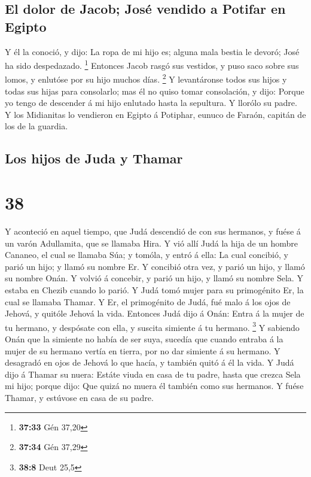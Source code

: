 \hypertarget{el-dolor-de-jacob-josuxe9-vendido-a-potifar-en-egipto}{%
\subsection{El dolor de Jacob; José vendido a Potifar en
Egipto}\label{el-dolor-de-jacob-josuxe9-vendido-a-potifar-en-egipto}}

 Y él la conoció, y dijo: La ropa de mi hijo es; alguna
mala bestia le devoró; José ha sido despedazado. \footnote{\textbf{37:33}
  Gén 37,20}  Entonces Jacob rasgó sus vestidos, y puso
saco sobre sus lomos, y enlutóse por su hijo muchos días. \footnote{\textbf{37:34}
  Gén 37,29}  Y levantáronse todos sus hijos y todas sus
hijas para consolarlo; mas él no quiso tomar consolación, y dijo: Porque
yo tengo de descender á mi hijo enlutado hasta la sepultura. Y llorólo
su padre.  Y los Midianitas lo vendieron en Egipto á
Potiphar, eunuco de Faraón, capitán de los de la guardia.

\hypertarget{los-hijos-de-juda-y-thamar}{%
\subsection{Los hijos de Juda y
Thamar}\label{los-hijos-de-juda-y-thamar}}

\hypertarget{section-37}{%
\section{38}\label{section-37}}

 Y aconteció en aquel tiempo, que Judá descendió de con sus
hermanos, y fuése á un varón Adullamita, que se llamaba Hira.
 Y vió allí Judá la hija de un hombre Cananeo, el cual se
llamaba Súa; y tomóla, y entró á ella:  La cual concibió, y
parió un hijo; y llamó su nombre Er.  Y concibió otra vez, y
parió un hijo, y llamó su nombre Onán.  Y volvió á concebir,
y parió un hijo, y llamó su nombre Sela. Y estaba en Chezib cuando lo
parió.  Y Judá tomó mujer para su primogénito Er, la cual se
llamaba Thamar.  Y Er, el primogénito de Judá, fué malo á
los ojos de Jehová, y quitóle Jehová la vida.  Entonces Judá
dijo á Onán: Entra á la mujer de tu hermano, y despósate con ella, y
suscita simiente á tu hermano. \footnote{\textbf{38:8} Deut 25,5}
 Y sabiendo Onán que la simiente no había de ser suya,
sucedía que cuando entraba á la mujer de su hermano vertía en tierra,
por no dar simiente á su hermano.  Y desagradó en ojos de
Jehová lo que hacía, y también quitó á él la vida.  Y Judá
dijo á Thamar su nuera: Estáte viuda en casa de tu padre, hasta que
crezca Sela mi hijo; porque dijo: Que quizá no muera él también como sus
hermanos. Y fuése Thamar, y estúvose en casa de su padre.

